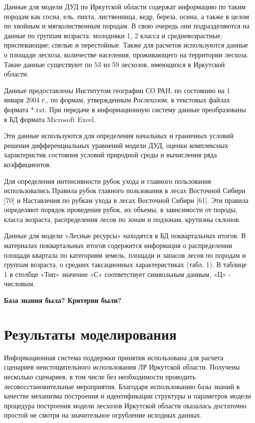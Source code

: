Данные для модели ДУД по Иркутской области содержат информацию по таким породам как сосна, ель, пихта, лиственница, кедр, береза, осина, а также в целом по хвойным и мягколиственным породам. В свою очередь они подразделяются на данные по группам возраста: молодняки 1, 2 класса и средневозрастные; приспевающие; спелые и перестойные. Также для расчетов используются данные о площади лесхоза, количестве населения, проживающего на территории лесхоза. Такие данные существуют по 53 из 59 лесхозов, имеющихся в Иркутской области.

Данные предоставлены Институтом географии СО РАН, по состоянию на 1 января 2004 г., по формам, утвержденным Рослехозом, в текстовых файлах формата *.txt. При передаче в информационную систему данные преобразованы в БД формата Microsoft Excel.

Эти данные используются для определения начальных и граничных условий решения дифференциальных уравнений модели ДУД, оценки комплексных характеристик состояния условий природной среды и вычисления ряда коэффициентов.

Для определения интенсивности рубок ухода и главного пользования использовались Правила рубок главного пользования в лесах Восточной Сибири [70] и Наставления по рубкам ухода в лесах Восточной Сибири [61]. Эти правила определяют порядок проведения рубок, их объемы, в зависимости от породы, класса возраста, распределения лесов по зонам и подзонам, крутизны склонов.

Данные для модели «Лесные ресурсы» находятся в БД поквартальных итогов. В материалах поквартальных итогов содержится информация о распределении площади квартала по категориям земель, площади и запасов лесов по породам и группам возраста, о средних таксационных характеристиках (табл. 1). В таблице 1 в столбце «Тип» значение «С» соответствует символьным данным, «Ц» - числовым.

{ \bf База знания была? Критерии были?}

\section{Результаты моделирования}

Информационная система поддержки принятия использована для расчета сценариев неистощительного использования ЛР Иркутской области. Получены несколько сценариев, в том числе без необходимости проводить лесовосстановительные мероприятия. Благодаря использованию базы знаний в качестве механизма построения и идентификации структуры и параметров модели процедура построения модели лесхозов Иркутской области оказалась достаточно простой не смотря на значительное огрубление исходных данных.

